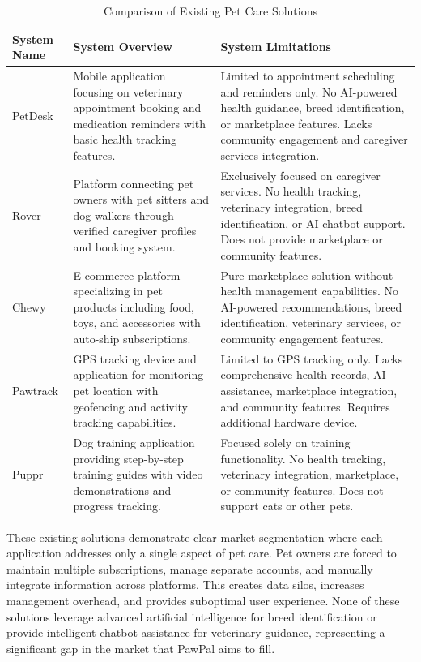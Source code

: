 \begin{table}[H]
\centering
\caption{Comparison of Existing Pet Care Solutions}
\begin{tabular}{|l|p{5.5cm}|p{5.5cm}|}
\hline
\textbf{System Name}   & \textbf{System Overview} & \textbf{System Limitations} \\ \hline
PetDesk & Mobile application focusing on veterinary appointment booking and medication reminders with basic health tracking features. & Limited to appointment scheduling and reminders only. No AI-powered health guidance, breed identification, or marketplace features. Lacks community engagement and caregiver services integration. \\ \hline
Rover & Platform connecting pet owners with pet sitters and dog walkers through verified caregiver profiles and booking system. & Exclusively focused on caregiver services. No health tracking, veterinary integration, breed identification, or AI chatbot support. Does not provide marketplace or community features. \\ \hline
Chewy & E-commerce platform specializing in pet products including food, toys, and accessories with auto-ship subscriptions. & Pure marketplace solution without health management capabilities. No AI-powered recommendations, breed identification, veterinary services, or community engagement features. \\ \hline
Pawtrack & GPS tracking device and application for monitoring pet location with geofencing and activity tracking capabilities. & Limited to GPS tracking only. Lacks comprehensive health records, AI assistance, marketplace integration, and community features. Requires additional hardware device. \\ \hline
Puppr & Dog training application providing step-by-step training guides with video demonstrations and progress tracking. & Focused solely on training functionality. No health tracking, veterinary integration, marketplace, or community features. Does not support cats or other pets. \\ \hline
\end{tabular}
\label{tab:existing_solutions}
\end{table}

These existing solutions demonstrate clear market segmentation where each application addresses only a single aspect of pet care. Pet owners are forced to maintain multiple subscriptions, manage separate accounts, and manually integrate information across platforms. This creates data silos, increases management overhead, and provides suboptimal user experience. None of these solutions leverage advanced artificial intelligence for breed identification or provide intelligent chatbot assistance for veterinary guidance, representing a significant gap in the market that PawPal aims to fill.

